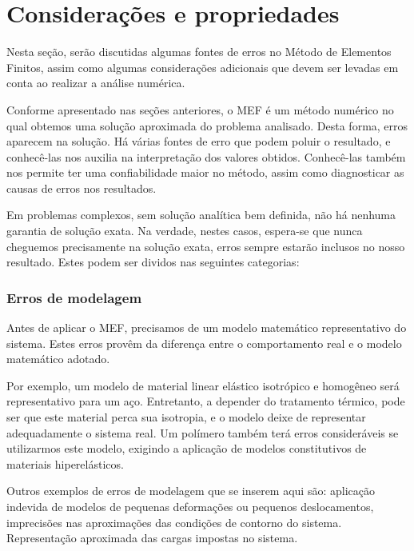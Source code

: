 
\cleardoublepage
\section{Considerações e propriedades}

    Nesta seção, serão discutidas algumas fontes de erros no Método de Elementos Finitos, assim como algumas considerações adicionais que devem ser levadas em conta ao realizar a análise numérica.

    Conforme apresentado nas seções anteriores, o MEF é um método numérico no qual obtemos uma solução aproximada do problema analisado. Desta forma, erros aparecem na solução. Há várias fontes de erro que podem poluir o resultado, e conhecê-las nos auxilia na interpretação dos valores obtidos. Conhecê-las também nos permite ter uma confiabilidade maior no método, assim como diagnosticar as causas de erros nos resultados.

    Em problemas complexos, sem solução analítica bem definida, não há nenhuma garantia de solução exata. Na verdade, nestes casos, espera-se que nunca cheguemos precisamente na solução exata, erros sempre estarão inclusos no nosso resultado. Estes podem ser dividos nas seguintes categorias:

    \subsubsection*{Erros de modelagem}

        Antes de aplicar o MEF, precisamos de um modelo matemático representativo do sistema. Estes erros provêm da diferença entre o comportamento real e o modelo matemático adotado.

        Por exemplo, um modelo de material linear elástico isotrópico e homogêneo será representativo para um aço. Entretanto, a depender do tratamento térmico, pode ser que este material perca sua isotropia, e o modelo deixe de representar adequadamente o sistema real. Um polímero também terá erros consideráveis se utilizarmos este modelo, exigindo a aplicação de modelos constitutivos de materiais hiperelásticos.

        

        Outros exemplos de erros de modelagem que se inserem aqui são: aplicação indevida de modelos de pequenas deformações ou pequenos deslocamentos, imprecisões nas aproximações das condições de contorno do sistema. Representação aproximada das cargas impostas no sistema.

